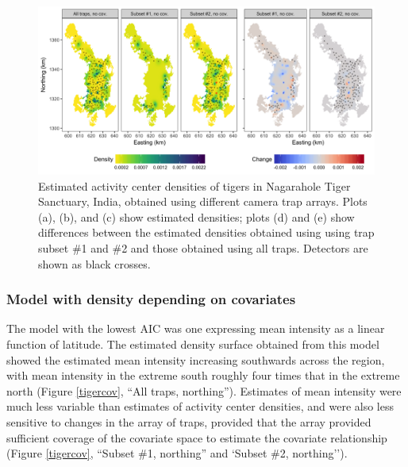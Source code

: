 \documentclass[a4paper,12pt]{article}
\begin{document}
\begin{figure}[htbp]
\centering
\includegraphics[width=1\textwidth]{tiger_surfaces_nocovs.png}
\caption{Estimated activity center densities of tigers in Nagarahole Tiger Sanctuary, India, obtained using different camera trap arrays. Plots (a), (b), and (c) show estimated densities; plots (d) and (e) show differences between the estimated densities obtained using using trap subset \#1 and \#2 and those obtained using all traps. Detectors are shown as black crosses.}
\label{tigernocov}
\end{figure}

\subsubsection{Model with density depending on covariates}

The model with the lowest AIC was one expressing mean intensity as a linear function of latitude. The estimated density surface obtained from this model showed the estimated mean intensity increasing southwards across the region, with mean intensity in the extreme south roughly four times that in the extreme north (Figure \ref{tigercov}, ``All traps, northing''). Estimates of mean intensity were much less variable than estimates of activity center densities, and were also less sensitive to changes in the array of traps, provided that the array provided sufficient coverage of the covariate space to estimate the covariate relationship (Figure \ref{tigercov}, ``Subset \#1, northing'' and `Subset \#2, northing''). 
\end{document}
